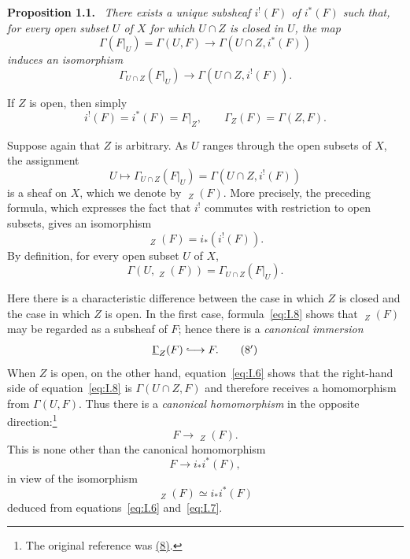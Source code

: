 \documentclass[11pt,a4paper,oneside]{book}
\providecommand{\srcpage}[1]{%
  \marginpar{\raggedright\scriptsize\color{gray}Original French p.~#1}}
\providecommand{\uGamma}{\mathop{\underline{\Gamma}}\nolimits}
\providecommand{\restr}[2]{#1\vert_{#2}}
\newenvironment{sgastatement}[1]
  {\par\addvspace{0.8\baselineskip}\noindent\textbf{#1.}\ \itshape}
  {\par\addvspace{0.35\baselineskip}}
\theoremstyle{plain}
\theoremstyle{definition}
\theoremstyle{remark}
\begin{document}
\begin{sgastatement}{Proposition 1.1}
There exists a unique subsheaf $i^!(F)$ of $i^*(F)$ such that, for every
open subset $U$ of $X$ for which $U\cap Z$ is closed in $U$, the map
\[
  \Gamma(\restr{F}{U})=\Gamma(U,F)\longrightarrow
  \Gamma(U\cap Z,i^*(F))
\]
induces an isomorphism
\[
  \Gamma_{U\cap Z}(\restr{F}{U})\longrightarrow
  \Gamma(U\cap Z,i^!(F)).
\]
\end{sgastatement}

If $Z$ is open, then simply
\begin{equation}
  i^!(F)=i^*(F)=\restr{F}{Z},
  \qquad \Gamma_Z(F)=\Gamma(Z,F).
  \tag{6}\label{eq:I.6}
\end{equation}

Suppose again that $Z$ is arbitrary.  As $U$ ranges through the open
subsets of $X$, the assignment
\[
  U\longmapsto \Gamma_{U\cap Z}(\restr{F}{U})
  =\Gamma(U\cap Z,i^!(F))
\]
is a sheaf on $X$, which we denote by $\uGamma_Z(F)$.  More precisely,
the preceding formula, which expresses the fact that $i^!$ commutes with
restriction to open subsets, gives an isomorphism
\begin{equation}
  \uGamma_Z(F)=i_*(i^!(F)).
  \tag{7}\label{eq:I.7}
\end{equation}
By definition,\srcpage{8} for every open subset $U$ of $X$,
\begin{equation}
  \Gamma(U,\uGamma_Z(F))
  =\Gamma_{U\cap Z}(\restr{F}{U}).
  \tag{8}\label{eq:I.8}
\end{equation}

Here there is a characteristic difference between the case in which
$Z$ is closed and the case in which $Z$ is open.  In the first case,
formula~\eqref{eq:I.8} shows that $\uGamma_Z(F)$ may be regarded as a
subsheaf of $F$; hence there is a \emph{canonical immersion}
\begin{equation}
  \uGamma_Z(F)\lhook\joinrel\longrightarrow F.
  \tag{$8'$}\label{eq:I.8'}
\end{equation}
When $Z$ is open, on the other hand, equation~\eqref{eq:I.6} shows that
the right-hand side of equation~\eqref{eq:I.8} is
$\Gamma(U\cap Z,F)$ and therefore receives a homomorphism from
$\Gamma(U,F)$.  Thus there is a \emph{canonical homomorphism} in the
opposite direction:\footnote{The original reference was \hyperref[eq:I.8]{(8)}.}
\begin{equation}
  F\longrightarrow\uGamma_Z(F).
  \tag{$8''$}\label{eq:I.8''}
\end{equation}
This is none other than the canonical homomorphism
\[
  F\longrightarrow i_*i^*(F),
\]
in view of the isomorphism
\begin{equation}
  \uGamma_Z(F)\simeq i_*i^*(F)
  \tag{6 bis}\label{eq:I.6bis}
\end{equation}
deduced from equations~\eqref{eq:I.6} and~\eqref{eq:I.7}.
\end{document}
